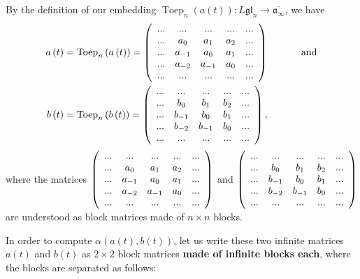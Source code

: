 \documentclass[etingof-lie.tex]{subfiles}
\begin{document}
By the definition of our embedding $\operatorname*{Toep}\nolimits_{n}\left(
a\left(  t\right)  \right)  :L\mathfrak{gl}_{n}\rightarrow\overline
{\mathfrak{a}_{\infty}}$, we have%
\begin{align*}
a\left(  t\right)   &  =\operatorname*{Toep}\nolimits_{n}\left(  a\left(
t\right)  \right)  =\left(
\begin{array}
[c]{ccccc}%
... & ... & ... & ... & ...\\
... & a_{0} & a_{1} & a_{2} & ...\\
... & a_{-1} & a_{0} & a_{1} & ...\\
... & a_{-2} & a_{-1} & a_{0} & ...\\
... & ... & ... & ... & ...
\end{array}
\right)  \ \ \ \ \ \ \ \ \ \ \text{and}\\
b\left(  t\right)   &  =\operatorname*{Toep}\nolimits_{n}\left(  b\left(
t\right)  \right)  =\left(
\begin{array}
[c]{ccccc}%
... & ... & ... & ... & ...\\
... & b_{0} & b_{1} & b_{2} & ...\\
... & b_{-1} & b_{0} & b_{1} & ...\\
... & b_{-2} & b_{-1} & b_{0} & ...\\
... & ... & ... & ... & ...
\end{array}
\right)  ,
\end{align*}
where the matrices $\left(
\begin{array}
[c]{ccccc}%
... & ... & ... & ... & ...\\
... & a_{0} & a_{1} & a_{2} & ...\\
... & a_{-1} & a_{0} & a_{1} & ...\\
... & a_{-2} & a_{-1} & a_{0} & ...\\
... & ... & ... & ... & ...
\end{array}
\right)  $ and $\left(
\begin{array}
[c]{ccccc}%
... & ... & ... & ... & ...\\
... & b_{0} & b_{1} & b_{2} & ...\\
... & b_{-1} & b_{0} & b_{1} & ...\\
... & b_{-2} & b_{-1} & b_{0} & ...\\
... & ... & ... & ... & ...
\end{array}
\right)  $ are understood as block matrices made of $n\times n$ blocks.

In order to compute $\alpha\left(  a\left(  t\right)  ,b\left(  t\right)
\right)  $, let us write these two infinite matrices $a\left(  t\right)  $ and
$b\left(  t\right)  $ as $2\times2$ block matrices \textbf{made of infinite
blocks each}, where the blocks are separated as follows:
\end{document}
